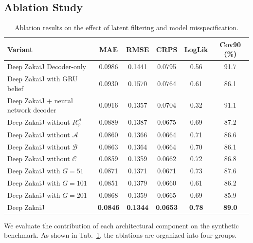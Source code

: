 \documentclass{article}
\newcommand{\lengComments}[1]{\par\smallskip\noindent\textcolor{lengCommentColor}{\textbf{[Leng comment:} #1\textbf{]}}\par\smallskip}
\begin{document}
\subsection{Ablation Study}
\label{app:ablation}
\begin{table}[ht]
\centering
\caption{Ablation results on the effect of latent filtering and model misspecification.}
\label{tab:ablation}
\scriptsize
\setlength{\tabcolsep}{5.0pt}
\begin{tabular}{lccccc}
\toprule
Variant & MAE & RMSE & CRPS & LogLik & Cov90 (\%) \\
\midrule
Deep ZakaiJ Decoder-only & 0.0986 & 0.1441 & 0.0795 & 0.56 & 91.7 \\
Deep ZakaiJ with GRU belief & 0.0930 & 0.1570 & 0.0764 & 0.61 & 86.1 \\
\midrule
Deep ZakaiJ + neural network decoder & 0.0916 & 0.1357 & 0.0704 & 0.32 & 91.1 \\
\midrule
Deep ZakaiJ without $R^{\mathcal A}_\psi$ & 0.0889 & 0.1387 & 0.0675 & 0.69 & 87.2 \\
Deep ZakaiJ without $\mathcal A$ & 0.0860 & 0.1366 & 0.0664 & 0.71 & 86.6 \\
Deep ZakaiJ without $\mathcal B$ & 0.0863 & 0.1364 & 0.0664 & 0.70 & 86.1 \\
Deep ZakaiJ without $\mathcal C$ & 0.0859 & 0.1359 & 0.0662 & 0.72 & 86.8 \\
\midrule
Deep ZakaiJ with $G=51$  & 0.0871 & 0.1371 & 0.0671 & 0.73 & 87.6  \\
Deep ZakaiJ with $G=101$  & 0.0851 & 0.1379 & 0.0660  & 0.61 & 86.2 \\
Deep ZakaiJ with $G=201$  & 0.0868 & 0.1359 & 0.0665 & 0.69 & 85.9 \\
\midrule
Deep ZakaiJ & \textbf{0.0846} & \textbf{0.1344} & \textbf{0.0653} & \textbf{0.78} & \textbf{89.0} \\
\bottomrule
\end{tabular}
\end{table}

We evaluate the contribution of each architectural component on the synthetic benchmark. As shown in Tab.~\ref{tab:ablation}, the ablations are organized into four groups.
\end{document}
